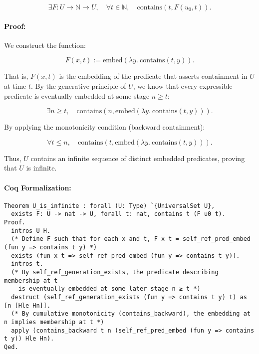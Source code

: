 \documentclass[12pt]{article}
\begin{document}
\begin{equation}
    \exists F: U \to \mathbb{N} \to U, \quad \forall t \in \mathbb{N}, \quad \text{contains}(t, F(u_0, t)).
\end{equation}

\paragraph{Proof:}
We construct the function:

\begin{equation}
    F(x, t) := \text{embed}(\lambda y.\ \text{contains}(t, y)).
\end{equation}

That is, \( F(x, t) \) is the embedding of the predicate that asserts containment in \( U \) at time \( t \). By the generative principle of \( U \), we know that every expressible predicate is eventually embedded at some stage \( n \geq t \):

\begin{equation}
    \exists n \geq t, \quad \text{contains}(n, \text{embed}(\lambda y.\ \text{contains}(t, y))).
\end{equation}

By applying the monotonicity condition (backward containment):

\begin{equation}
    \forall t \leq n, \quad \text{contains}(t, \text{embed}(\lambda y.\ \text{contains}(t, y))).
\end{equation}

Thus, \( U \) contains an infinite sequence of distinct embedded predicates, proving that \( U \) is infinite.

\paragraph{Coq Formalization:}
\begin{lstlisting}[language=Coq]
Theorem U_is_infinite : forall (U: Type) `{UniversalSet U},
  exists F: U -> nat -> U, forall t: nat, contains t (F u0 t).
Proof.
  intros U H.
  (* Define F such that for each x and t, F x t = self_ref_pred_embed (fun y => contains t y) *)
  exists (fun x t => self_ref_pred_embed (fun y => contains t y)).
  intros t.
  (* By self_ref_generation_exists, the predicate describing membership at t
    is eventually embedded at some later stage n ≥ t *)
  destruct (self_ref_generation_exists (fun y => contains t y) t) as [n [Hle Hn]].
  (* By cumulative monotonicity (contains_backward), the embedding at n implies membership at t *)
  apply (contains_backward t n (self_ref_pred_embed (fun y => contains t y)) Hle Hn).
Qed.
\end{lstlisting}
\end{document}
